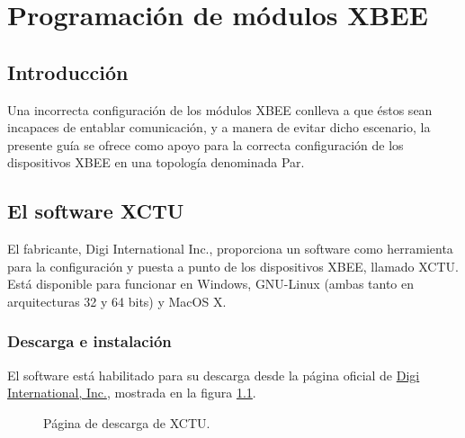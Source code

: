 \chapter{Programación de módulos XBEE}\label{Anx:xbeeGuia}
\section{Introducción}

Una incorrecta configuración de los módulos XBEE conlleva a que éstos sean incapaces de entablar comunicación, y a manera de evitar dicho escenario, la presente guía se ofrece como apoyo para la correcta configuración de los dispositivos XBEE en una topología denominada Par.


\section{El software XCTU}
El fabricante, Digi International Inc., proporciona un software como herramienta para la configuración y puesta a punto de los dispositivos XBEE, llamado XCTU. Está disponible para funcionar en Windows, GNU-Linux (ambas tanto en arquitecturas 32 y 64 bits) y MacOS X.


\subsection{Descarga e instalación} %
El software está habilitado para su descarga desde la página oficial de \href{http://www.digi.com/products/xbee-rf-solutions/xctu-software/xctu\#resources
}{Digi International, Inc.}\footnotemark, mostrada en la figura \ref{fig:Download}.


\begin{figure}[H] %
\caption{Página de descarga de XCTU.}
\label{fig:Download}
\end{figure}

